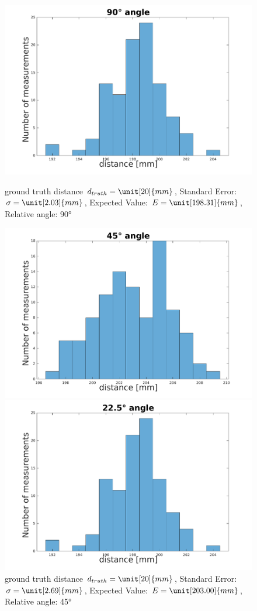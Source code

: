 \begin{figure}
	\centering
	\begin{minipage}{0.3\textwidth}
		\includegraphics[width=0.9\linewidth]{pictures/plot_angles_90.pdf}
		\caption{ground truth distance $d_{truth}= \unit[20]{mm}$, Standard Error: $\sigma=\unit[2.03]{mm}$, Expected Value: $E=\unit[198.31]{mm}$, Relative angle: 90°}
		\label{fig:angle901}
	\end{minipage}
	\quad
	\begin{minipage}{0.3\textwidth}
		\includegraphics[width=0.9\linewidth]{pictures/plot_angles_45.pdf}
		\caption{ground truth distance $d_{truth}= \unit[20]{mm}$, Standard Error: $\sigma=\unit[2.69]{mm}$, Expected Value: $E=\unit[203.00]{mm}$, Relative angle: 45°}
		\label{fig:angle451}
	\end{minipage}
	\quad
	\begin{minipage}{0.3\textwidth}
		\includegraphics[width=0.9\linewidth]{pictures/plot_angles_22.pdf}

\end{minipage}
\end{figure}
